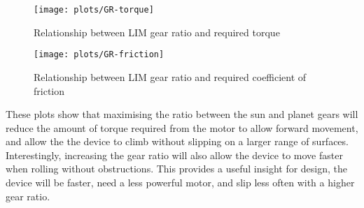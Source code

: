 \begin{figure}[h]
	\centering
	\texttt{[image: plots/GR-torque]}
	\caption{Relationship between LIM gear ratio and required torque}
	\label{fig:GR-torque}
\end{figure}
\begin{figure}[h]
	\centering
	\texttt{[image: plots/GR-friction]}
	\caption{Relationship between LIM gear ratio and required coefficient of friction}
	\label{fig:GR-friction}
\end{figure}
These plots show that maximising the ratio between the sun and planet gears will reduce the amount of torque required from the motor to allow forward movement, and allow the the device to climb without slipping on a larger range of surfaces. Interestingly, increasing the gear ratio will also allow the device to move faster when rolling without obstructions. This provides a useful insight for design, the device will be faster, need a less powerful motor, and slip less often with a higher gear ratio.

